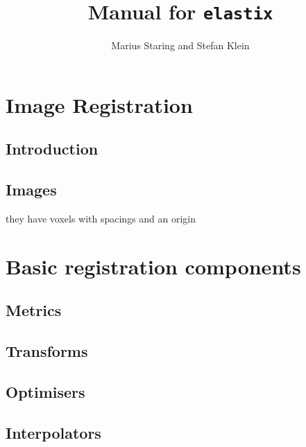 \documentclass[]{report}
\newcommand{\elastix}{\texttt{elastix}}
\begin{document}
\title{Manual for \elastix}
\author{Marius Staring and Stefan Klein}
\date{}
\maketitle

\setcounter{page}{1}  \tableofcontents
\newpage
{} \setcounter{page}{1}


\chapter{Image Registration}

\section{Introduction}

\section{Images}

they have voxels with spacings and an origin


\chapter{Basic registration components}

\section{Metrics}

\section{Transforms}

\section{Optimisers}

\section{Interpolators}
\end{document}
